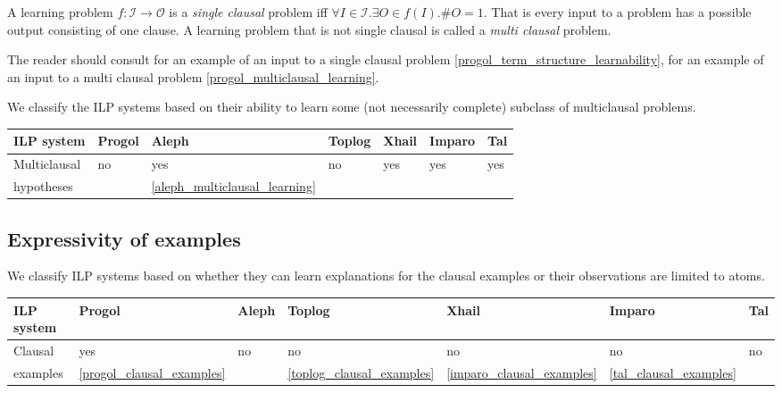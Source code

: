 \begin{defn}
A learning problem $f:\mathcal{I} \to \mathcal{O}$ is a 
\emph{single clausal} problem iff $\forall I \in \mathcal{I}. \exists O \in f(I). \# O = 1$. That is every input to a problem has a possible output consisting of one clause.
A learning problem that is not single clausal is called a \emph{multi clausal} problem.
\end{defn}

The reader should consult for an example of an input to a single clausal problem \ref{progol_term_structure_learnability}, for an example of an input to a multi clausal problem \ref{progol_multiclausal_learning}.

We classify the ILP systems based on their ability to learn some (not necessarily complete) subclass of multiclausal problems.

\begin{center}
 \label{tab:title} 
\begin{tabular}{| l | l | l | l | l | l | l |}
    \hline
    ILP system & Progol & Aleph & Toplog & Xhail & Imparo & Tal \\ \hline
    Multiclausal& no & yes & no & 
    yes & yes & yes \\ 
     hypotheses & \cite{muggleton2012mc}&\ref{aleph_multiclausal_learning}&
     \cite{muggleton2012mc}&\cite{muggleton2012mc}&\cite{muggleton2012mc}&
     \cite{muggleton2012mc}\\ 
    \hline
\end{tabular}
\end{center}

\subsection{Expressivity of examples}
We classify ILP systems based on whether they can learn explanations for the clausal examples or their observations are limited to atoms.

\begin{center}
 \label{tab:title} 
\begin{tabular}{| l | l | l | l | l | l | l |}
    \hline
    ILP system & Progol & Aleph & Toplog & Xhail & Imparo & Tal \\ \hline
    Clausal& yes & no & no & 
    no & no & no \\ 
     examples & \ref{progol_clausal_examples} &\cite{aleph2007}&
     \ref{toplog_clausal_examples}&
     \ref{imparo_clausal_examples}&\ref{tal_clausal_examples}\\
    \hline
\end{tabular}
\end{center}

